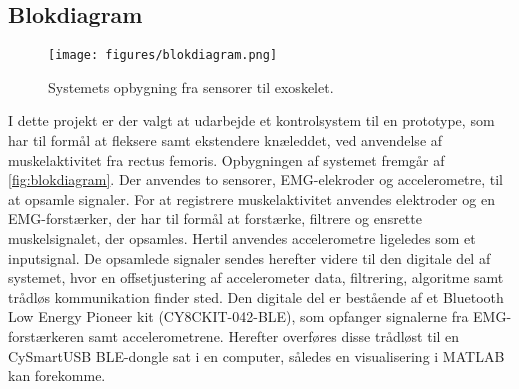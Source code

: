 \subsection{Blokdiagram} \label{sec:blokdiagram} 
\begin{figure}[H]
\centering
\texttt{[image: figures/blokdiagram.png]}
\caption{Systemets opbygning fra sensorer til exoskelet.}
\label{fig:blokdiagram}
\end{figure}

\noindent
I dette projekt er der valgt at udarbejde et kontrolsystem til en prototype, som har til formål at fleksere samt ekstendere knæleddet, ved anvendelse af muskelaktivitet fra rectus femoris. Opbygningen af systemet fremgår af \autoref{fig:blokdiagram}. Der anvendes to sensorer, EMG-elekroder og accelerometre, til at opsamle signaler. 
For at registrere muskelaktivitet anvendes elektroder og en EMG-forstærker, der har til formål at forstærke, filtrere og ensrette muskelsignalet, der opsamles. Hertil anvendes accelerometre ligeledes som et inputsignal.
De opsamlede signaler sendes herefter videre til den digitale del af systemet, hvor en offsetjustering af accelerometer data, filtrering, algoritme samt trådløs kommunikation finder sted. Den digitale del er bestående af et Bluetooth Low Energy Pioneer kit (CY8CKIT-042-BLE), som opfanger signalerne fra EMG-forstærkeren samt accelerometrene. Herefter overføres disse trådløst til en CySmartUSB BLE-dongle sat i en computer, således en visualisering i MATLAB kan forekomme.

